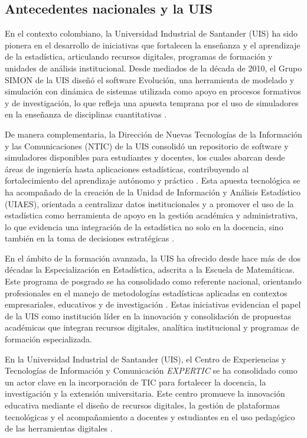 \documentclass[letter,oneside,12pt,spanish]{report}
\begin{document}
\subsection{Antecedentes nacionales y la UIS}

En el contexto colombiano, la Universidad Industrial de Santander (UIS) ha sido pionera en el 
desarrollo de iniciativas que fortalecen la enseñanza y el aprendizaje de la estadística, 
articulando recursos digitales, programas de formación y unidades de análisis institucional. 
Desde mediados de la década de 2010, el Grupo SIMON de la UIS diseñó el software Evolución, una 
herramienta de modelado y simulación con dinámica de sistemas utilizada como apoyo en procesos 
formativos y de investigación, lo que refleja una apuesta temprana por el uso de simuladores en 
la enseñanza de disciplinas cuantitativas \parencite{simon2016}.

De manera complementaria, la Dirección de Nuevas Tecnologías de la Información y las Comunicaciones
 (NTIC) de la UIS consolidó un repositorio de software y simuladores disponibles para estudiantes 
 y docentes, los cuales abarcan desde áreas de ingeniería hasta aplicaciones estadísticas, 
 contribuyendo al fortalecimiento del aprendizaje autónomo y práctico \parencite{nticsf}. Esta 
 apuesta tecnológica se ha acompañado de la creación de la Unidad de Información y Análisis 
 Estadístico (UIAES), orientada a centralizar datos institucionales y a promover el uso de la 
 estadística como herramienta de apoyo en la gestión académica y administrativa, lo que evidencia
  una integración de la estadística no solo en la docencia, sino también en la toma de decisiones 
  estratégicas \parencite{uiassf}.

En el ámbito de la formación avanzada, la UIS ha ofrecido desde hace más de dos décadas la 
Especialización en Estadística, adscrita a la Escuela de Matemáticas. Este programa de posgrado 
se ha consolidado como referente nacional, orientando profesionales en el manejo de metodologías 
estadísticas aplicadas en contextos empresariales, educativos y de investigación 
\parencite{especializacionstatssf}. Estas iniciativas evidencian el papel de la UIS como 
institución líder en la innovación y consolidación de propuestas académicas que integran 
recursos digitales, analítica institucional y programas de formación especializada.

En la Universidad Industrial de Santander (UIS), el Centro de Experiencias y 
Tecnologías de Información y Comunicación \textit{EXPERTIC} se ha consolidado como un actor clave 
en la incorporación de TIC para fortalecer la docencia, la investigación y la extensión universitaria. 
Este centro promueve la innovación educativa mediante el diseño de recursos digitales, la gestión de 
plataformas tecnológicas y el acompañamiento a docentes y estudiantes en el uso pedagógico de las 
herramientas digitales \parencite{UIS2025a}. 
\end{document}
